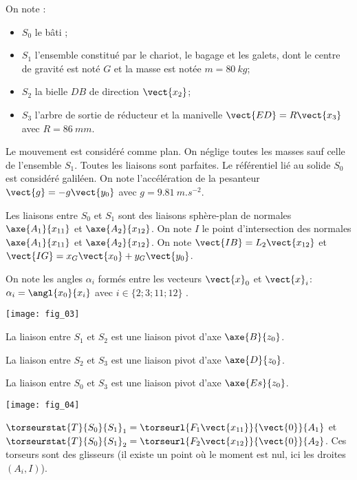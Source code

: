 On note :
\begin{itemize}
\item $S_0$ le bâti ;
\item $S_1$ l’ensemble constitué par le chariot, le bagage et les galets, dont le centre de gravité est noté $G$ et la masse est notée $m=\SI{80}{kg}$;
\item $S_2$ la bielle $DB$ de direction $\vect{x_2}$;
\item $S_3$ l’arbre de sortie de réducteur et la manivelle $\vect{ED}=R\vect{x_3}$ avec $R=\SI{86}{mm}$.
\end{itemize}
Le mouvement est considéré comme plan. On néglige toutes les masses sauf celle de l’ensemble $S_1$. Toutes les liaisons sont parfaites. Le référentiel lié au solide $S_0$ est considéré galiléen. On note l’accélération de la pesanteur $\vect{g}=-g\vect{y_0}$ avec $g=\SI{9,81}{m.s^{-2}}$.

Les liaisons entre $S_0$ et $S_1$ sont des liaisons sphère-plan de normales $\axe{A_1}{{x}_{11}}$ et $\axe{A_2}{{x}_{12}}$.
On note $I$ le point d’intersection des normales $\axe{A_1}{{x}_{11}}$ et $\axe{A_2}{{x}_{12}}$. On note $\vect{IB}=L_2\vect{x_{12}}$ et $\vect{IG}=x_G\vect{x_{0}}+y_G\vect{y_{0}}$.

On note les angles $\alpha_i$ formés entre les vecteurs $\vect{x}_0$ et $\vect{x}_i$: $\alpha_i=\angl{{x}_0}{{x}_i}$ avec $i\in \{2;3;11;12\}$ .


\begin{center}
\texttt{[image: fig\_03]}
\end{center}

La liaison entre $S_1$ et $S_2$ est une liaison pivot d’axe $\axe{B}{z_0}$.

La liaison entre $S_2$ et $S_3$ est une liaison pivot d’axe $\axe{D}{z_0}$.

La liaison entre $S_0$ et $S_3$ est une liaison pivot d’axe $\axe{Es}{z_0}$.


\begin{center}
\texttt{[image: fig\_04]}
\end{center}
\fi


\ifnormal
{}
\else
\fi


\ifprof
\begin{corrige}
$\torseurstat{T}{S_0}{S_1}_1=\torseurl{F_1\vect{x_{11}}}{\vect{0}}{A_1}$
et 
$\torseurstat{T}{S_0}{S_1}_2=\torseurl{F_2\vect{x_{12}}}{\vect{0}}{A_2}$. 
Ces torseurs sont des glisseurs (il existe un point où le moment est nul, ici les droites $(A_i,I)$). 
\end{corrige}
\else
\fi

